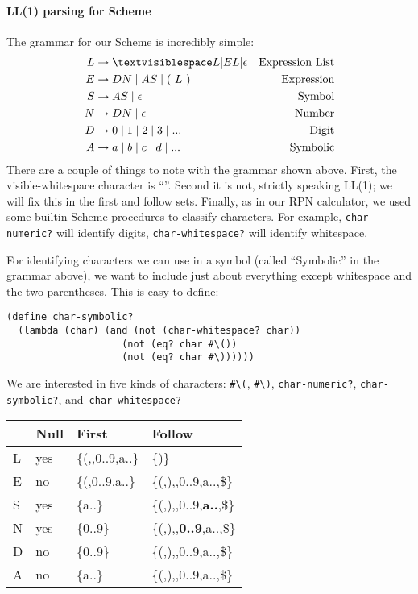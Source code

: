 \documentclass[letterpaper,12pt]{article}
\begin{document}
\paragraph{LL(1) parsing for Scheme}

The grammar for our Scheme is incredibly simple:
\begin{align*}
  L &\rightarrow \textvisiblespace L | EL | \epsilon  &\mbox{Expression List}\\
  E &\rightarrow DN \mid AS \mid (\ L\ ) &\mbox{Expression}\\
  S &\rightarrow AS \mid \epsilon &\mbox{Symbol}\\
  N &\rightarrow DN \mid \epsilon &\mbox{Number}\\
  D &\rightarrow 0 \mid 1 \mid 2 \mid 3 \mid ... &\mbox{Digit}\\
  A &\rightarrow a \mid b \mid c \mid d \mid ... &\mbox{Symbolic}\\
\end{align*}
%
There are a couple of things to note with the grammar shown above.  First, the
visible-whitespace character is ``\textvisiblespace''.  Second it is not,
strictly speaking LL(1); we will fix this in the first and follow sets.
Finally, as in our RPN calculator, we used some builtin Scheme procedures to
classify characters.  For example, \texttt{char-numeric?} will identify digits,
\texttt{char-whitespace?} will identify whitespace.

For identifying characters we can use in a symbol (called ``Symbolic'' in the
grammar above), we want to include just about everything except whitespace and
the two parentheses.  This is easy to define:
\begin{Verbatim}[frame=single]
(define char-symbolic?
  (lambda (char) (and (not (char-whitespace? char))
                    (not (eq? char #\())
                    (not (eq? char #\))))))  
\end{Verbatim}
We are interested in five kinds of characters: \verb|#\(|, \verb|#\)|,
\verb|char-numeric?|, \verb|char-symbolic?|, and~\verb|char-whitespace?|


\begin{center}
  \begin{tabular}[t]{l|l|l|l}
    &Null&First&Follow\\\hline
    L&yes&\{(,\textvisiblespace,0..9,a..\}&\{)\}\\
    E&no &\{(,0..9,a..\}&\{(,),\textvisiblespace,0..9,a..,\$\}\\
    S&yes&\{a..\}&\{(,),\textvisiblespace,0..9,\textbf{a..},\$\}\\
    N&yes&\{0..9\}&\{(,),\textvisiblespace,\textbf{0..9},a..,\$\}\\
    D&no &\{0..9\}&\{(,),\textvisiblespace,0..9,a..,\$\}\\
    A&no &\{a..\}&\{(,),\textvisiblespace,0..9,a..,\$\}\\
  \end{tabular}
\end{center}
\end{document}
